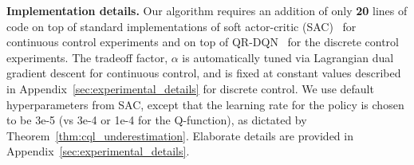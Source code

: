 \textbf{Implementation details.} Our algorithm requires an addition of only \textbf{20} lines of code on top of standard implementations of soft actor-critic (SAC)~\citep{haarnoja} for continuous control experiments and on top of QR-DQN~\citep{dabney2018distributional} for the discrete control experiments. The tradeoff factor, $\alpha$
is automatically tuned via Lagrangian dual gradient descent for continuous control, and is fixed at constant values described in Appendix~\ref{sec:experimental_details} for discrete control. We use default hyperparameters from SAC, except that the learning rate for the policy is chosen to be 3e-5 (vs 3e-4 or 1e-4 for the Q-function), as dictated by Theorem~\ref{thm:cql_underestimation}. Elaborate details are provided in Appendix~\ref{sec:experimental_details}.  
